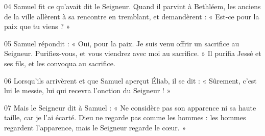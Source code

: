 
04 Samuel fit ce qu’avait dit le Seigneur. Quand il parvint à Bethléem, les anciens de la ville allèrent à sa rencontre en tremblant, et demandèrent : « Est-ce pour la paix que tu viens ? »

05 Samuel répondit : « Oui, pour la paix. Je suis venu offrir un sacrifice au Seigneur. Purifiez-vous, et vous viendrez avec moi au sacrifice. » Il purifia Jessé et ses fils, et les convoqua au sacrifice.

06 Lorsqu’ils arrivèrent et que Samuel aperçut Éliab, il se dit : « Sûrement, c’est lui le messie, lui qui recevra l’onction du Seigneur ! »

07 Mais le Seigneur dit à Samuel : « Ne considère pas son apparence ni sa haute taille, car je l’ai écarté. Dieu ne regarde pas comme les hommes : les hommes regardent l’apparence, mais le Seigneur regarde le cœur. »
